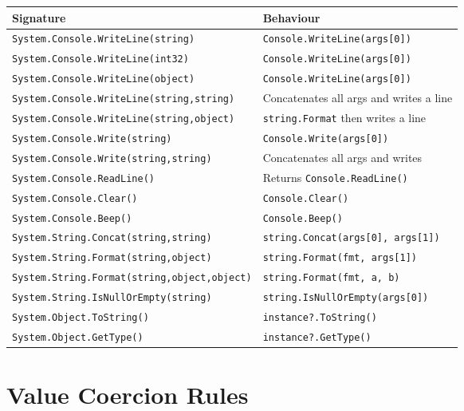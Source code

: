 \documentclass[11pt,a4paper]{article}
\begin{document}
\begin{longtable}{lp{8cm}}
\toprule
\textbf{Signature} & \textbf{Behaviour} \\
\midrule
\texttt{System.Console.WriteLine(string)}      & \texttt{Console.WriteLine(args[0])} \\
\texttt{System.Console.WriteLine(int32)}       & \texttt{Console.WriteLine(args[0])} \\
\texttt{System.Console.WriteLine(object)}      & \texttt{Console.WriteLine(args[0])} \\
\texttt{System.Console.WriteLine(string,string)} & Concatenates all args and writes a line \\
\texttt{System.Console.WriteLine(string,object)} & \texttt{string.Format} then writes a line \\
\texttt{System.Console.Write(string)}          & \texttt{Console.Write(args[0])} \\
\texttt{System.Console.Write(string,string)}   & Concatenates all args and writes \\
\texttt{System.Console.ReadLine()}             & Returns \texttt{Console.ReadLine()} \\
\texttt{System.Console.Clear()}                & \texttt{Console.Clear()} \\
\texttt{System.Console.Beep()}                 & \texttt{Console.Beep()} \\
\texttt{System.String.Concat(string,string)}   & \texttt{string.Concat(args[0], args[1])} \\
\texttt{System.String.Format(string,object)}   & \texttt{string.Format(fmt, args[1])} \\
\texttt{System.String.Format(string,object,object)} & \texttt{string.Format(fmt, a, b)} \\
\texttt{System.String.IsNullOrEmpty(string)}   & \texttt{string.IsNullOrEmpty(args[0])} \\
\texttt{System.Object.ToString()}              & \texttt{instance?.ToString()} \\
\texttt{System.Object.GetType()}               & \texttt{instance?.GetType()} \\
\bottomrule
\end{longtable}

\section{Value Coercion Rules}
\end{document}

